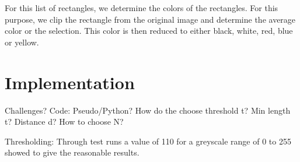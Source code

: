 For this list of rectangles, we determine the colors of the rectangles. For this
purpose, we clip the rectangle from the original image and determine the average
color or the selection. This color is then reduced to either black, white, red,
blue or yellow.

\section{Implementation}


Challenges?
Code: Pseudo/Python?
How do the choose threshold t?
Min length t?
Distance d?
How to choose N?

Thresholding:
Through test runs a value of 110 for a greyscale range of 0 to 255
showed to give the reasonable results.
